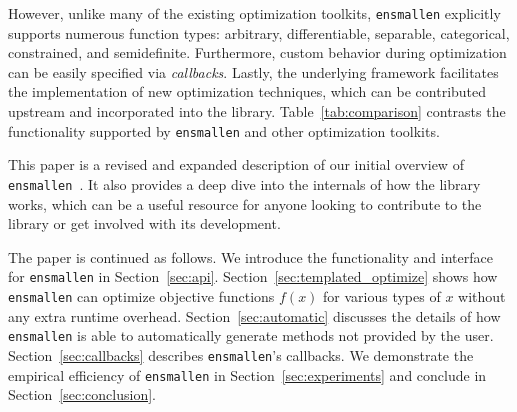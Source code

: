 However, unlike many of the existing optimization toolkits,
{\tt ensmallen} explicitly supports numerous function types:
arbitrary, differentiable, separable, categorical, constrained, and semidefinite.
Furthermore, custom behavior during optimization can be easily specified via {\it callbacks}.
Lastly, the underlying framework facilitates the implementation of new optimization techniques,
which can be contributed upstream and incorporated into the library.
Table~\ref{tab:comparison} contrasts the functionality supported
by {\tt ensmallen} and other optimization toolkits.

This paper is a revised and expanded description of our initial overview
of {\tt ensmallen}~\cite{ensmallen2018}. 
It also provides a deep dive into the internals
of how the library works, which can be a useful resource for anyone looking
to contribute to the library or get involved with its development.


The paper is continued as follows.
We introduce the functionality and interface for {\tt ensmallen} in Section~\ref{sec:api}.
Section~\ref{sec:templated_optimize} shows how {\tt ensmallen} can optimize objective functions
$f(x)$ for various types of $x$ without any extra runtime overhead.
Section~\ref{sec:automatic} discusses the details of how {\tt ensmallen} is able
to automatically generate methods not provided by the user.
Section~\ref{sec:callbacks} describes {\tt ensmallen}'s callbacks.
We demonstrate the empirical efficiency of {\tt ensmallen} in
Section~\ref{sec:experiments} and conclude in Section~\ref{sec:conclusion}.


